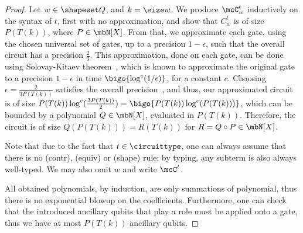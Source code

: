 \begin{proof}
  Let $w \in \shapeset Q$, and $k = \size w$. We produce $\mcC_w^t$
  inductively on the syntax of $t$, first with no approximation, and show that
  $C_w^t$ is of size $P(T(k))$, where $P \in \mbN[X]$.
  From that, we approximate each gate, using the
  chosen universal set of gates, up to a precision $1 - \epsilon$, such that the
  overall circuit has a precision $\frac 2 3$. This approximation, done on each
  gate, can be done using Solovay-Kitaev theorem~\cite{Kit97}, which is known to
  approximate the original gate to a precision $1 - \epsilon$ in time
  $\bigo{\log^c(1/\epsilon)}$, for a constant $c$. Choosing $\epsilon = \frac 2
  {3P(T(k))}$ satisfies the overall precision~\cite{NC12}, and thus, our
  approximated circuit is of size $P(T(k)) \log^c(\frac {3 P(T(k))} 2) =
  \bigo{P(T(k)) \log^c(P(T(k)))}$, which can be bounded by a polynomial $Q \in
  \mbN[X]$, evaluated in $P(T(k))$. Therefore, the circuit is of size
  $Q(P(T(k))) = R(T(k))$ for $R = Q \circ P \in \mbN[X]$.

  Note that due to the fact that $t \in \circuittype$, one can
  always assume that there is no (contr), (equiv) or (shape) rule; by typing,
  any subterm is also always well-typed.
  We may also omit $w$ and write $\mcC^t$.

  All obtained polynomials, by induction, are only summations of polynomial,
  thus there is no exponential blowup on the coefficients. Furthermore, one can
  check that the introduced ancillary qubits that play a role must be applied
  onto a gate, thus we have at most $P(T(k))$ ancillary qubits.


\end{proof}
